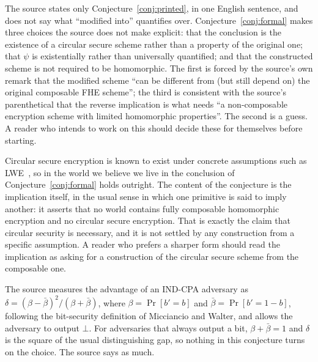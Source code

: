 \documentclass{aicr-conjecture}
\begin{document}
\begin{remark}\label{rem:reading}
The source states only Conjecture~\ref{conj:printed}, in one English
sentence, and does not say what ``modified into'' quantifies over.
Conjecture~\ref{conj:formal} makes three choices the source does not
make explicit: that the conclusion is the existence of a circular
secure scheme rather than a property of the original one; that $\psi$
is existentially rather than universally quantified; and that the
constructed scheme is not required to be homomorphic. The first is
forced by the source's own remark that the modified scheme ``can be
different from (but still depend on) the original composable FHE
scheme''; the third is consistent with the source's parenthetical that
the reverse implication is what needs ``a non-composable encryption
scheme with limited homomorphic properties''. The second is a guess. A
reader who intends to work on this should decide these for themselves
before starting.
\end{remark}

\begin{remark}\label{rem:vacuous}
Circular secure encryption is known to exist under concrete assumptions
such as LWE~\cite{ACPS09}, so in the world we believe we live in the
conclusion of Conjecture~\ref{conj:formal} holds outright. The content
of the conjecture is the implication itself, in the usual sense in
which one primitive is said to imply another: it asserts that no world
contains fully composable homomorphic encryption and no circular secure
encryption. That is exactly the claim that circular security is
necessary, and it is not settled by any construction from a specific
assumption. A reader who prefers a sharper form should read the
implication as asking for a construction of the circular secure scheme
from the composable one.
\end{remark}

\begin{remark}\label{rem:advantage}
The source measures the advantage of an IND-CPA adversary as
$\delta = (\beta - \bar\beta)^{2}/(\beta + \bar\beta)$, where $\beta =
\Pr[b' = b]$ and $\bar\beta = \Pr[b' = 1-b]$, following the
bit-security definition of Micciancio and Walter, and allows the
adversary to output $\bot$. For adversaries that always output a bit,
$\beta + \bar\beta = 1$ and $\delta$ is the square of the usual
distinguishing gap, so nothing in this conjecture turns on the choice.
The source says as much.
\end{remark}
\end{document}
